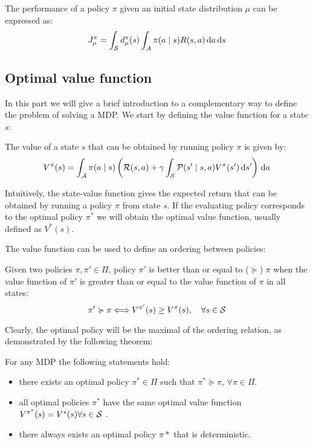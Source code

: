 \begin{definition}[Performance]
The performance of a policy $\pi$ given an initial state distribution $\mu$ can be expressed as: 
\begin{equation*}
J_{\mu}^{\pi} = \int_{\mathcal{S}} d_{\mu}^{\pi}(s) \int_{\mathcal{A}} \pi(a \mid s) R(s,a) \, \textrm{d} a \, \textrm{d} s
\end{equation*}
\end{definition}


\subsection{Optimal value function}
In this part we will give a brief introduction to a complementary way to define the problem of solving a MDP. We start by defining the value function for a state $s$:

\begin{definition}
The value of a state $s$ that can be obtained by running policy $\pi$ is given by:
\[
V^{\pi}(s) = \int_{\mathcal{A}} \pi(a \mid s) \left( \mathcal{R}(s,a) + \gamma \int_{\mathcal{S}} \mathcal{P}(s' \mid s, a) V^{\pi} (s') \, \textrm{d} s' \right) \, \textrm{d} a
\]
\end{definition}

Intuitively, the state-value function gives the expected return that can be obtained by running a policy $\pi$ from state $s$. If the evaluating policy corresponds to the optimal policy $\pi^*$ we will obtain the optimal value function, usually defined as $V^*(s)$. 

The value function can be used to define an ordering between policies:
\begin{definition}
Given two policies $\pi, \pi' \in \Pi$, policy $\pi'$ is better than or equal to ($\succcurlyeq$) $\pi$ when the value function of $\pi'$ is greater than or equal to the value function of $\pi$ in all states:
\[
\pi' \succcurlyeq \pi \Longleftrightarrow V^{\pi'}(s) \geq V^{\pi}(s),\quad \forall s \in \mathcal{S}
\]
\end{definition}

Clearly, the optimal policy will be the maximal of the ordering relation, as demonstrated by the following theorem:

\begin{theorem} 
For any MDP the following statements hold:
\begin{itemize}
\item there exists an optimal policy $\pi^* \in \Pi$ such that $\pi^* \succcurlyeq  \pi$, $\forall \pi \in \Pi$.
\item all optimal policies $\pi^*$ have the same optimal value function $V^{\pi^*}(s) = V^*(s) \forall s \in \mathcal{S}$ .
\item there always exists an optimal policy $\pi*$ that is deterministic.
\end{itemize}
\end{theorem}


